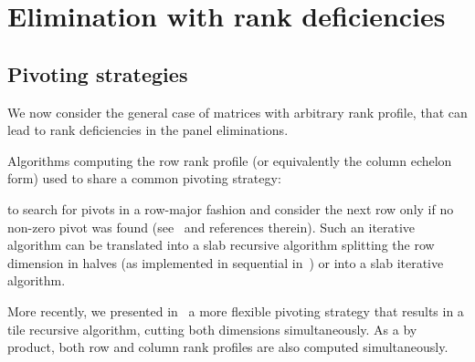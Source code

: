 \documentclass{article}
\begin{document}
  
  
  
  
  
  


 
 

 
 
 
 
 
 
 
 
 
 
 
 
 
 
 
 
 
 
 
 
 
 

 

 
 
\section{Elimination with rank deficiencies}
\label{sec:rankdef}
 
\subsection{Pivoting strategies}
We now consider the general case of matrices with arbitrary rank
profile, that can lead to rank deficiencies in the panel eliminations.
 
 
Algorithms computing the row rank profile (or equivalently the column
echelon form) used to share a common pivoting strategy:
 
to search for pivots in a row-major fashion and consider the next row only if no
non-zero pivot was found (see~\cite{JPS13} and references therein).
Such an iterative algorithm can be translated into a slab recursive algorithm
splitting the row dimension in halves (as implemented in sequential
in~\cite{DGP08}) or into a slab iterative algorithm.
 
 
 
 
 
 
 
 
 
 
 
 
 
More recently, we presented in~\cite{DPS13} a more flexible pivoting strategy
that results in a tile recursive algorithm, cutting both dimensions
simultaneously. As a by product, both row and column rank profiles are
also computed simultaneously.
 
 
 
\end{document}
